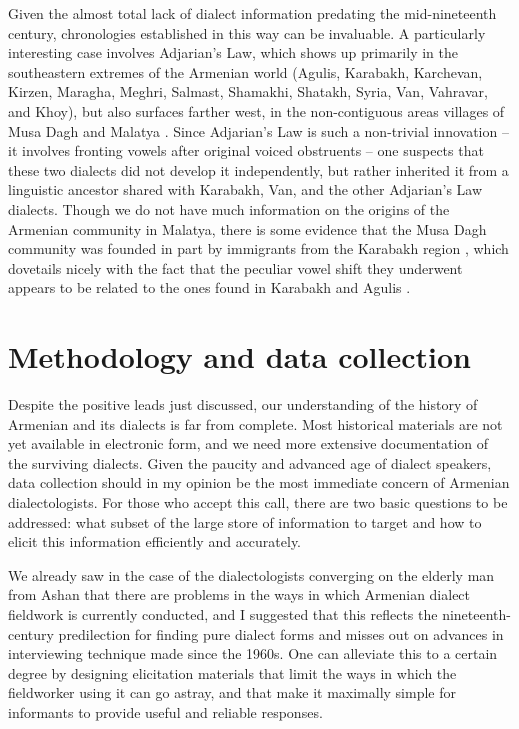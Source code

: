 \documentclass[output=paper]{langscibook}
\begin{document}
Given the almost total lack of dialect information predating the mid\hyp nineteenth century, chronologies established in this way can be invaluable. A particularly interesting case involves Adjarian's Law, which shows up primarily in the southeastern extremes of the Armenian world (Agulis, Karabakh, Karchevan, Kirzen, Maragha, Meghri, Salmast, Shamakhi, Shatakh, Syria, Van, Vahravar, and Khoy), but also surfaces farther west, in the non-contiguous areas villages of Musa Dagh and Malatya \citep{Vaux-1998-ArmenianPhono}.  Since Adjarian's Law is such a non-trivial innovation -- it involves fronting vowels after original voiced obstruents -- one suspects that these two dialects did not develop it independently, but rather inherited it from a linguistic ancestor shared with Karabakh, Van, and the other Adjarian's Law dialects. Though we do not have much information on the origins of the Armenian community in Malatya, there is some evidence that the Musa Dagh community was founded in part by immigrants from the Karabakh region \citep{Andreasyan-1967-SvediaDialect}, which dovetails nicely with the fact that the peculiar vowel shift they underwent appears to be related to the ones found in Karabakh and Agulis \citep{Vaux-1998-ArmenianPhono}. 

\section{Methodology and data collection}\label{sec:vaux:method}

Despite the positive leads just discussed, our understanding of the history of Armenian and its dialects is far from complete. Most historical materials are not yet available in electronic form, and we need more extensive documentation of the surviving dialects. Given the paucity and advanced age of dialect speakers, data collection should in my opinion be the most immediate concern of Armenian dialectologists. For those who accept this call, there are two basic questions to be addressed: what subset of the large store of information to target and how to elicit this information efficiently and accurately. 

We already saw in the case of the dialectologists converging on the elderly man from Ashan that there are problems in the ways in which Armenian dialect fieldwork is currently conducted, and I suggested that this reflects the nineteenth-century predilection for finding pure dialect forms and misses out on advances in interviewing technique made since the 1960s. One can alleviate this to a certain degree by designing elicitation materials that limit the ways in which the fieldworker using it can go astray, and that make it maximally simple for informants to provide useful and reliable responses. 
\end{document}
